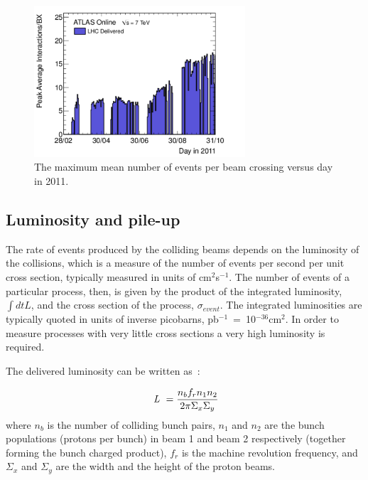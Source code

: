 \begin{figure}[htbp]
  \begin{center}
      \includegraphics[width=0.7\textwidth]{Fig2/peakAvgMuByDay.pdf}
    \caption{The maximum mean number of events per beam crossing versus day in 2011.}
    \label{fig:peakAvgMu}
  \end{center}
\end{figure}


\subsection{Luminosity and pile-up}\label{sec:lumiintro}

The rate of events produced by the colliding beams depends on the luminosity of the collisions, which is a measure of the number of events per second per unit cross section, typically measured in units of cm$^2$s$^{-1}$. The number of events of a particular process, then, is given by the product of the integrated luminosity, $\int dt L$, and the cross section of the process, $\sigma_{event}$.  The integrated luminosities are typically quoted in units of inverse picobarns, pb$^{-1}$~=~10$^{-36}$cm$^{2}$. In order to measure processes with very little cross sections a very high luminosity is required. 

The delivered luminosity can be written as~\cite{ATLAS-CONF-2011-116}:

\begin{equation} 
\mbox{ {\it L }} = \frac{n_b f_r n_1 n_2 }{2\pi \Sigma_x \Sigma_y}
\label{eqn:lumi}
\end{equation} 
where $n_b$ is the number of colliding bunch pairs,  $n_1$ and $n_2$ are the bunch populations (protons per bunch) in beam 1 and beam 2 respectively (together forming the bunch charged product), $f_r$ is the machine revolution frequency, and $\Sigma_x$ and $\Sigma_y$ are the width and the height of the proton beams. %

